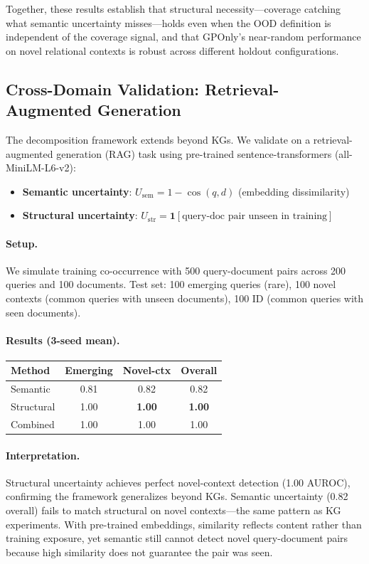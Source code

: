 \documentclass{article}
\begin{document}
Together, these results establish that structural necessity---coverage catching what semantic uncertainty misses---holds even when the OOD definition is independent of the coverage signal, and that GPOnly's near-random performance on novel relational contexts is robust across different holdout configurations.

\subsection{Cross-Domain Validation: Retrieval-Augmented Generation}
\label{app:rag}

The decomposition framework extends beyond KGs. We validate on a retrieval-augmented generation (RAG) task using pre-trained sentence-transformers (all-MiniLM-L6-v2):
\begin{itemize}
\item \textbf{Semantic uncertainty}: $U_{\text{sem}} = 1 - \cos(q, d)$ (embedding dissimilarity)
\item \textbf{Structural uncertainty}: $U_{\text{str}} = \mathbf{1}[\text{query-doc pair unseen in training}]$
\end{itemize}

\paragraph{Setup.}
We simulate training co-occurrence with 500 query-document pairs across 200 queries and 100 documents. Test set: 100 emerging queries (rare), 100 novel contexts (common queries with unseen documents), 100 ID (common queries with seen documents).

\paragraph{Results (3-seed mean).}
\begin{center}
\begin{tabular}{lccc}
\toprule
Method & Emerging & Novel-ctx & Overall \\
\midrule
Semantic & 0.81 & 0.82 & 0.82 \\
Structural & 1.00 & \textbf{1.00} & \textbf{1.00} \\
Combined & 1.00 & 1.00 & 1.00 \\
\bottomrule
\end{tabular}
\end{center}

\paragraph{Interpretation.}
Structural uncertainty achieves perfect novel-context detection (1.00 AUROC), confirming the framework generalizes beyond KGs. Semantic uncertainty (0.82 overall) fails to match structural on novel contexts---the same pattern as KG experiments. With pre-trained embeddings, similarity reflects content rather than training exposure, yet semantic still cannot detect novel query-document pairs because high similarity does not guarantee the pair was seen.
\end{document}
